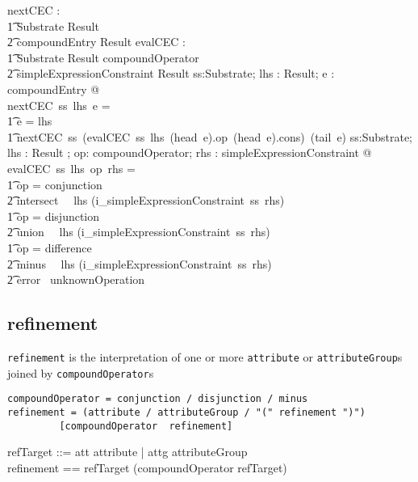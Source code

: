 \documentclass{article}
\def\spec#1{{\tt #1}}
\begin{document}
\begin{gendef}
   nextCEC : \\
\t1 Substrate \fun Result \fun \\
\t2 \seq compoundEntry \fun Result
\also
   evalCEC : \\
\t1 Substrate \fun Result \fun compoundOperator \fun \\
\t2 simpleExpressionConstraint \fun Result
\where
   \forall ss:Substrate; lhs : Result; e :  \seq compoundEntry @ \\
   nextCEC~ss~lhs~e = \\
\t1 \IF e = \langle \rangle \THEN lhs \\
\t1 \ELSE nextCEC~ss~(evalCEC~ss~lhs~(head~e).op~(head~e).cons)~(tail~e) 
\also
   \forall ss:Substrate; lhs : Result ; op: compoundOperator; rhs : simpleExpressionConstraint @ \\
   evalCEC~ss~lhs~op~rhs = \\
\t1 \IF op = conjunction \\
\t2 \THEN intersect~~ lhs (i\_simpleExpressionConstraint~ss~rhs) \\
\t1 \ELSE \IF op = disjunction \\
\t2 \THEN union~~ lhs (i\_simpleExpressionConstraint~ss~rhs) \\
\t1 \ELSE \IF op = difference \\
\t2 \THEN minus~~ lhs (i\_simpleExpressionConstraint~ss~rhs)  \\
\t2 \ELSE error~ unknownOperation
\end{gendef}

\subsection{refinement}
\spec{refinement} is the interpretation of one or more \spec{attribute} or \spec{attributeGroup}s joined
by \spec{compoundOperator}s

\begin{verbatim}
compoundOperator = conjunction / disjunction / minus
refinement = (attribute / attributeGroup / "(" refinement ")") 
         [compoundOperator 	refinement]
\end{verbatim}
\begin{zed}
refTarget ::= att \ldata attribute \rdata | attg \ldata attributeGroup \rdata \\
refinement == refTarget  \cross \seq(compoundOperator \cross refTarget)\\
\end{zed}
\end{document}

